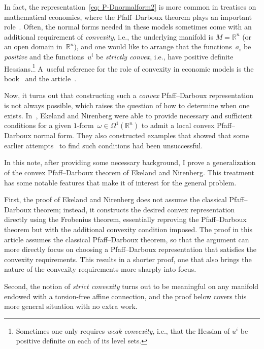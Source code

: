 \documentclass[pdftex]{sigma}
\newcommand{\bbR}{{\mathbb R}}
\numberwithin{equation}{section}
\begin{document}
In fact, the representation~\eqref{eq: P-Dnormalform2}
is more common in treatises on mathematical economics,
where the Pfaff--Darboux theorem plays an important role~\cite{MR1655519}.
Often, the normal forms needed in these models
sometimes come with an additional requirement of \emph{convexity},
i.e., the underlying manifold is $M=\bbR^n$
(or an open domain in~$\bbR^n$),
and one would like to arrange that the functions~$a_i$
be \emph{positive} and the functions~$u^i$ be \emph{strictly convex},
i.e., have positive definite Hessians.\footnote{Sometimes one only requires \emph{weak convexity},
i.e., that the Hessian of $u^i$ be positive definite
on each of its level sets.}
A~useful reference for the role of convexity
in economic models is the book~\cite{ChiapporiEkeland2009}
and the article~\cite{BrowningChiappori1998}.

Now, it turns out that constructing such a \emph{convex} Pfaff--Darboux
representation is not always possible,
which raises the question of how to determine when one exists.
In~\cite{MR2023129}, Ekeland and Nirenberg
were able to provide necessary and sufficient conditions
for a given $1$-form~$\omega\in\Omega^1(\bbR^n)$
to admit a local convex Pfaff--Darboux normal form.
They also constructed examples that showed
that some earlier attempts~\cite{MR1655519, MR1652709}
to find such conditions had been unsuccessful.

In this note, after providing some necessary background,
I prove a generalization of the convex Pfaff--Darboux theorem
of Ekeland and Nirenberg. This treatment has some
notable features that make it of interest for the general problem.

First, the proof of Ekeland and Nirenberg
does not assume the classical Pfaff--Darboux theorem;
instead, it constructs the desired convex representation directly
using the Frobenius theorem, essentially reproving the Pfaff--Darboux theorem
but with the additional convexity condition imposed.
The proof in this article assumes the classical
Pfaff--Darboux theorem, so that the argument can more directly focus
on choosing a Pfaff--Darboux representation
that satisfies the convexity requirements. This results in a shorter
proof, one that also brings the nature of the convexity requirements
more sharply into focus.

Second, the notion of \emph{strict convexity}
turns out to be meaningful on any manifold endowed with
a torsion-free affine connection, and the proof below
covers this more general situation with no extra work.
\end{document}
